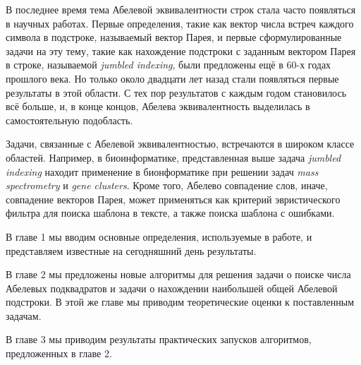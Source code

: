 
В последнее время тема Абелевой эквивалентности строк стала часто появляться в научных работах.
Первые определения, такие как вектор числа встреч каждого символа в подстроке, называемый вектор Парея,
и первые сформулированные задачи на эту тему, такие как нахождение подстроки
с заданным вектором Парея в строке, называемой \textit{jumbled indexing}, были предложены ещё в 60-х годах прошлого века.
Но только около двадцати лет назад стали появляться первые результаты в этой области.
С тех пор результатов с каждым годом становилось всё больше, и, в конце концов, Абелева эквивалентность выделилась в
самостоятельную подобласть.

Задачи, связанные с Абелевой эквивалентностью, встречаются в широком классе областей.
Например, в биоинформатике, представленная выше задача \textit{jumbled indexing} находит применение в бионформатике
при решении задач \textit{mass spectrometry} и \textit{gene clusters}.
Кроме того, Абелево совпадение слов, иначе, совпадение векторов Парея,
может применяться как критерий эвристического фильтра для поиска шаблона в тексте,
а также поиска шаблона с ошибками.

В главе 1 мы вводим основные определения, используемые в работе, и представляем
известные на сегодняшний день результаты.

В главе 2 мы предложены новые алгоритмы для решения задачи о поиске числа Абелевых подквадратов
и задачи о нахождении наибольшей общей Абелевой подстроки.
В этой же главе мы приводим теоретические оценки к поставленным задачам.

В главе 3 мы приводим результаты практических запусков алгоритмов, предложенных в главе 2.

